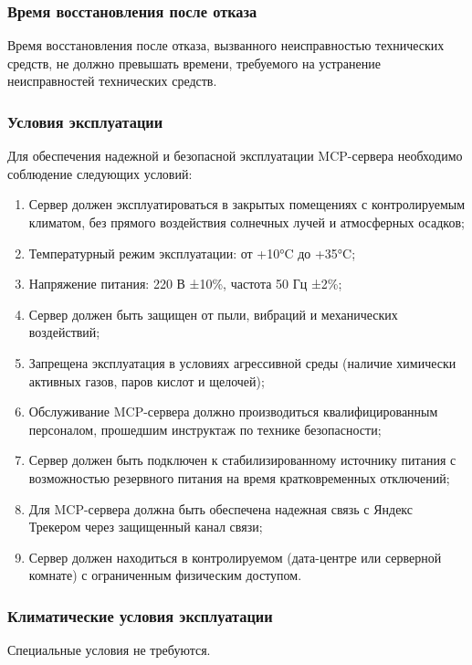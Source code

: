 \documentclass[utf8, russian]{eskdtext}
\begin{document}
\subsubsection{Время восстановления после отказа}
Время восстановления после отказа, вызванного неисправностью технических средств, не должно превышать времени,
требуемого на устранение неисправностей технических средств.

\subsubsection{Условия эксплуатации}

Для обеспечения надежной и безопасной эксплуатации MCP-сервера необходимо соблюдение следующих условий:

\begin{enumerate}
    \item Сервер должен эксплуатироваться в закрытых помещениях с контролируемым климатом, без прямого воздействия солнечных лучей и атмосферных осадков;
    \item Температурный режим эксплуатации: от +10°C до +35°C;
    \item Напряжение питания: 220 В ±10\%, частота 50 Гц ±2\%;
    \item Сервер должен быть защищен от пыли, вибраций и механических воздействий;
    \item Запрещена эксплуатация в условиях агрессивной среды (наличие химически активных газов, паров кислот и щелочей);
    \item Обслуживание MCP-сервера должно производиться квалифицированным персоналом, прошедшим инструктаж по технике безопасности;
    \item Сервер должен быть подключен к стабилизированному источнику питания с возможностью резервного питания на время кратковременных отключений;
    \item Для MCP-сервера должна быть обеспечена надежная связь с Яндекс Трекером через защищенный канал связи;
    \item Сервер должен находиться в контролируемом (дата-центре или серверной комнате) с ограниченным физическим доступом.
\end{enumerate}

\subsubsection{Климатические условия эксплуатации}
Специальные условия не требуются.
\end{document}
